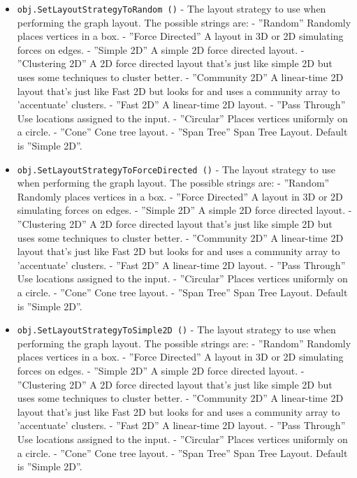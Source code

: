 \begin{itemize}
\item  \verb|obj.SetLayoutStrategyToRandom ()| -  The layout strategy to use when performing the graph layout.
 The possible strings are:
  - ''Random''         Randomly places vertices in a box.
  - ''Force Directed'' A layout in 3D or 2D simulating forces on edges.
  - ''Simple 2D''      A simple 2D force directed layout.
  - ''Clustering 2D''  A 2D force directed layout that's just like
                     simple 2D but uses some techniques to cluster better.
  - ''Community 2D''   A linear-time 2D layout that's just like
                    Fast 2D but looks for and uses a community 
                    array to 'accentuate' clusters.
  - ''Fast 2D''       A linear-time 2D layout.
  - ''Pass Through''  Use locations assigned to the input.
  - ''Circular''      Places vertices uniformly on a circle.
  - ''Cone''          Cone tree layout.
  - ''Span Tree''     Span Tree Layout.
 Default is ''Simple 2D''.

\item  \verb|obj.SetLayoutStrategyToForceDirected ()| -  The layout strategy to use when performing the graph layout.
 The possible strings are:
  - ''Random''         Randomly places vertices in a box.
  - ''Force Directed'' A layout in 3D or 2D simulating forces on edges.
  - ''Simple 2D''      A simple 2D force directed layout.
  - ''Clustering 2D''  A 2D force directed layout that's just like
                     simple 2D but uses some techniques to cluster better.
  - ''Community 2D''   A linear-time 2D layout that's just like
                    Fast 2D but looks for and uses a community 
                    array to 'accentuate' clusters.
  - ''Fast 2D''       A linear-time 2D layout.
  - ''Pass Through''  Use locations assigned to the input.
  - ''Circular''      Places vertices uniformly on a circle.
  - ''Cone''          Cone tree layout.
  - ''Span Tree''     Span Tree Layout.
 Default is ''Simple 2D''.

\item  \verb|obj.SetLayoutStrategyToSimple2D ()| -  The layout strategy to use when performing the graph layout.
 The possible strings are:
  - ''Random''         Randomly places vertices in a box.
  - ''Force Directed'' A layout in 3D or 2D simulating forces on edges.
  - ''Simple 2D''      A simple 2D force directed layout.
  - ''Clustering 2D''  A 2D force directed layout that's just like
                     simple 2D but uses some techniques to cluster better.
  - ''Community 2D''   A linear-time 2D layout that's just like
                    Fast 2D but looks for and uses a community 
                    array to 'accentuate' clusters.
  - ''Fast 2D''       A linear-time 2D layout.
  - ''Pass Through''  Use locations assigned to the input.
  - ''Circular''      Places vertices uniformly on a circle.
  - ''Cone''          Cone tree layout.
  - ''Span Tree''     Span Tree Layout.
 Default is ''Simple 2D''.


\end{itemize}
